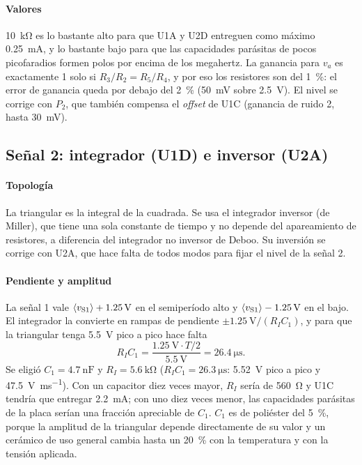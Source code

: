 \paragraph*{Valores} \SI{10}{\kilo\ohm} es lo bastante alto para que U1A y U2D entreguen como máximo \SI{0,25}{\milli\ampere}, y lo bastante bajo para que las capacidades parásitas de pocos picofaradios formen polos por encima de los megahertz. La ganancia para $v_a$ es exactamente 1 solo si $R_3/R_2 = R_5/R_4$, y por eso los resistores son del \SI{1}{\percent}: el error de ganancia queda por debajo del \SI{2}{\percent} (\SI{50}{\milli\volt} sobre \SI{2,5}{\volt}). El nivel se corrige con $P_2$, que también compensa el \emph{offset} de U1C (ganancia de ruido 2, hasta \SI{30}{\milli\volt}).

\subsection{Señal 2: integrador (U1D) e inversor (U2A)}
\label{sec:integrador}
\paragraph*{Topología} La triangular es la integral de la cuadrada. Se usa el integrador inversor (de Miller), que tiene una sola constante de tiempo y no depende del apareamiento de resistores, a diferencia del integrador no inversor de Deboo. Su inversión se corrige con U2A, que hace falta de todos modos para fijar el nivel de la señal 2.

\paragraph*{Pendiente y amplitud} La señal 1 vale $\langle v_{\mathrm{S1}} \rangle + \SI{1,25}{\volt}$ en el semiperíodo alto y $\langle v_{\mathrm{S1}} \rangle - \SI{1,25}{\volt}$ en el bajo. El integrador la convierte en rampas de pendiente $\pm\SI{1,25}{\volt}/(R_I C_1)$, y para que la triangular tenga \SI{5,5}{\volt} pico a pico hace falta
\begin{equation}
R_I C_1 = \frac{\SI{1,25}{\volt} \cdot T/2}{\SI{5,5}{\volt}} = \SI{26,4}{\micro\second}.
\label{eq:ric1}
\end{equation}
Se eligió $C_1 = \SI{4,7}{\nano\farad}$ y $R_I = \SI{5,6}{\kilo\ohm}$ ($R_I C_1 = \SI{26,3}{\micro\second}$: \SI{5,52}{\volt} pico a pico y \SI{47,5}{\volt\per\milli\second}). Con un capacitor diez veces mayor, $R_I$ sería de \SI{560}{\ohm} y U1C tendría que entregar \SI{2,2}{\milli\ampere}; con uno diez veces menor, las capacidades parásitas de la placa serían una fracción apreciable de $C_1$. $C_1$ es de poliéster del \SI{5}{\percent}, porque la amplitud de la triangular depende directamente de su valor y un cerámico de uso general cambia hasta un \SI{20}{\percent} con la temperatura y con la tensión aplicada.

